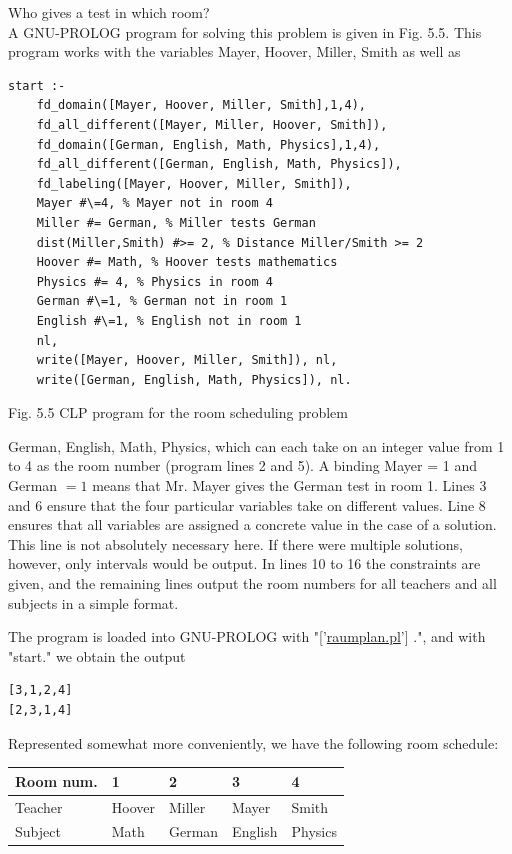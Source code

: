 \documentclass[10pt]{book}
\begin{document}
Who gives a test in which room?\\
A GNU-PROLOG program for solving this problem is given in Fig. 5.5. This program works with the variables Mayer, Hoover, Miller, Smith as well as

\begin{verbatim}
start :-
    fd_domain([Mayer, Hoover, Miller, Smith],1,4),
    fd_all_different([Mayer, Miller, Hoover, Smith]),
    fd_domain([German, English, Math, Physics],1,4),
    fd_all_different([German, English, Math, Physics]),
    fd_labeling([Mayer, Hoover, Miller, Smith]),
    Mayer #\=4, % Mayer not in room 4
    Miller #= German, % Miller tests German
    dist(Miller,Smith) #>= 2, % Distance Miller/Smith >= 2
    Hoover #= Math, % Hoover tests mathematics
    Physics #= 4, % Physics in room 4
    German #\=1, % German not in room 1
    English #\=1, % English not in room 1
    nl,
    write([Mayer, Hoover, Miller, Smith]), nl,
    write([German, English, Math, Physics]), nl.
\end{verbatim}

Fig. 5.5 CLP program for the room scheduling problem

German, English, Math, Physics, which can each take on an integer value from 1 to 4 as the room number (program lines 2 and 5). A binding Mayer = 1 and German $=1$ means that Mr. Mayer gives the German test in room 1. Lines 3 and 6 ensure that the four particular variables take on different values. Line 8 ensures that all variables are assigned a concrete value in the case of a solution. This line is not absolutely necessary here. If there were multiple solutions, however, only intervals would be output. In lines 10 to 16 the constraints are given, and the remaining lines output the room numbers for all teachers and all subjects in a simple format.

The program is loaded into GNU-PROLOG with "['\href{http://raumplan.pl}{raumplan.pl}'] .", and with "start." we obtain the output

\begin{verbatim}
[3,1,2,4]
[2,3,1,4]
\end{verbatim}

Represented somewhat more conveniently, we have the following room schedule:

\begin{center}
\begin{tabular}{lllll}
\hline
Room num. & 1 & 2 & 3 & 4 \\
\hline
Teacher & Hoover & Miller & Mayer & Smith \\
\hline
Subject & Math & German & English & Physics \\
\hline
\end{tabular}
\end{center}
\end{document}
